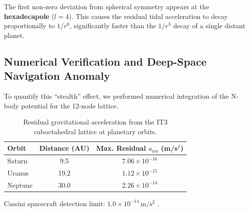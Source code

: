 \documentclass[11pt,a4paper]{article}
\theoremstyle{remark}
\begin{document}
The first non-zero deviation from spherical symmetry appears at the \textbf{hexadecapole} ($l=4$). This causes the residual tidal acceleration to decay proportionally to $1/r^6$, significantly faster than the $1/r^3$ decay of a single distant planet.

\subsection{Numerical Verification and Deep-Space Navigation Anomaly}

To quantify this ``stealth'' effect, we performed numerical integration of the N-body potential for the 12-node lattice.

\begin{table}[htbp]
    \centering
    \caption{Residual gravitational acceleration from the IT3 cuboctahedral lattice at planetary orbits.}
    \label{tab:acceleration}
    \begin{threeparttable}
    \begin{tabular}{lcc}
        \toprule
        \textbf{Orbit} & \textbf{Distance (AU)} & \textbf{Max. Residual $a_{\text{res}}$ (m/s$^2$)} \\
        \midrule
        Saturn  & 9.5  & $7.06 \times 10^{-16}$ \\
        Uranus  & 19.2 & $1.12 \times 10^{-15}$ \\
        Neptune & 30.0 & $2.26 \times 10^{-14}$ \\
        \bottomrule
    \end{tabular}
    \begin{tablenotes}
        \small
        \item Cassini spacecraft detection limit: $1.0 \times 10^{-14}\,\mathrm{m/s^2}$ \cite{anderson2002}.
    \end{tablenotes}
    \end{threeparttable}
\end{table}
\end{document}
